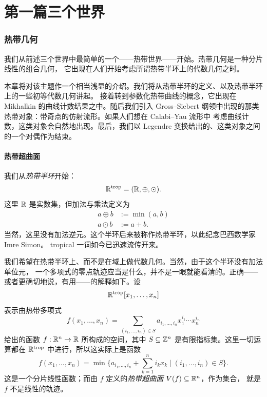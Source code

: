 
\part{第一篇\quad 三个世界}

\section{热带几何}

我们从前述三个世界中最简单的一个——热带世界——开始。热带几何是一种分片线性的组合几何，
它出现在人们开始考虑所谓热带半环上的代数几何之时。

本章将对该主题作一个相当浅显的介绍。我们将从热带半环的定义、以及热带半环上的一些初等代数几何讲起。
接着转到参数化热带曲线的概念，它出现在 Mikhalkin 的曲线计数结果之中。随后我们引入
Gross--Siebert 纲领中出现的那类热带对象：带奇点的仿射流形。如果人们想在 Calabi--Yau 流形中
考虑曲线计数，这类对象会自然地出现。最后，我们以 Legendre 变换给出的、这类对象之间的一个对偶作为结束。

\subsection{热带超曲面}

我们从\emph{热带半环}开始：
\[
  \mathbb{R}^{\mathrm{trop}}=(\mathbb{R},\oplus,\odot).
\]
这里 $\mathbb{R}$ 是实数集，但加法与乘法定义为
\[
  \begin{aligned}
    a\oplus b &:= \min(a,b)\\
    a\odot b &:= a+b .
  \end{aligned}
\]
当然，这里没有加法逆元。这个半环后来被称作热带半环，以此纪念巴西数学家 Imre Simon。
tropical 一词如今已迅速流传开来。


我们希望在热带半环上、而不是在域上做代数几何。当然，由于这个半环没有加法单位元，
一个多项式的零点轨迹应当是什么，并不是一眼就能看清的。正确——或者更确切地说，有用——的解释如下。设
\[
  \mathbb{R}^{\mathrm{trop}}[x_1,\dots,x_n]
\]
表示由热带多项式
\[
  f(x_1,\dots,x_n)=\sum_{(i_1,\dots,i_n)\in S}a_{i_1,\dots,i_n}x_1^{i_1}\cdots x_n^{i_n}
\]
给出的函数 $f:\mathbb{R}^n\to\mathbb{R}$ 所构成的空间，其中 $S\subseteq\mathbb{Z}^n$ 是有限指标集。这里一切运算都在
$\mathbb{R}^{\mathrm{trop}}$ 中进行，所以这实际上是函数
\[
  f(x_1,\dots,x_n)=\min\Big\{a_{i_1,\dots,i_n}+\sum_{k=1}^{n}i_kx_k \;\Big|\; (i_1,\dots,i_n)\in S\Big\}.
\]
这是一个分片线性函数；而由 $f$ 定义的\emph{热带超曲面} $V(f)\subseteq\mathbb{R}^n$，作为集合，
就是 $f$ 不是线性的轨迹。

